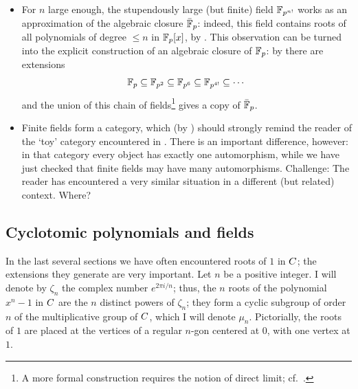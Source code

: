 \begin{itemize}
\item For $n$ large enough, the stupendously large (but finite) field
  $\mathbb{F}_{p^{n!}}$ works as an approximation of the algebraic closure
  $\bar{\mathbb{F}}_p$: indeed, this field contains roots of all polynomials
  of degree $\leq n$ in $\mathbb{F}_p[x]$, by . This
  observation can be turned into the explicit construction of an
  algebraic closure of $\mathbb{F}_p$: by  there are
  extensions
  \[
    \mathbb{F}_p \subseteq \mathbb{F}_{p^2} \subseteq \mathbb{F}_{p^6} \subseteq \mathbb{F}_{p^{4!}}
    \subseteq \cdots
  \]
  and the union of this chain of fields\footnote{A more formal
    construction requires the notion of direct limit; cf.\
    .}  gives a copy of
  $\bar{\mathbb{F}}_p$.
\item Finite fields form a category, which (by )
  should strongly remind the reader of the `toy' category encountered
  in \Cref{exer:prelim:dvbty-cat-Z}. There is an important difference,
  however: in that category every object has exactly one automorphism,
  while we have just checked that finite fields may have many
  automorphisms. Challenge: The reader has encountered a very similar
  situation in a different (but related) context. Where?
\end{itemize}

\subsection{Cyclotomic polynomials and fields}
\label{subsec:fields:cyclotomic-polynomials-and-fields}
In the last several sections we have often encountered roots of $1$ in
$C$; the extensions they generate are very important. Let $n$ be a
positive integer. I will denote by $\zeta_n$ the complex number
$e^{2\pi i/n}$; thus, the $n$ roots of the polynomial $x^n - 1$ in
$C$ are the $n$ distinct powers of $\zeta_n$; they form a cyclic
subgroup of order $n$ of the multiplicative group of $C$, which I
will denote $\mu_n$.  Pictorially, the roots of $1$ are placed at the
vertices of a regular $n$-gon centered at $0$, with one vertex at $1$.

